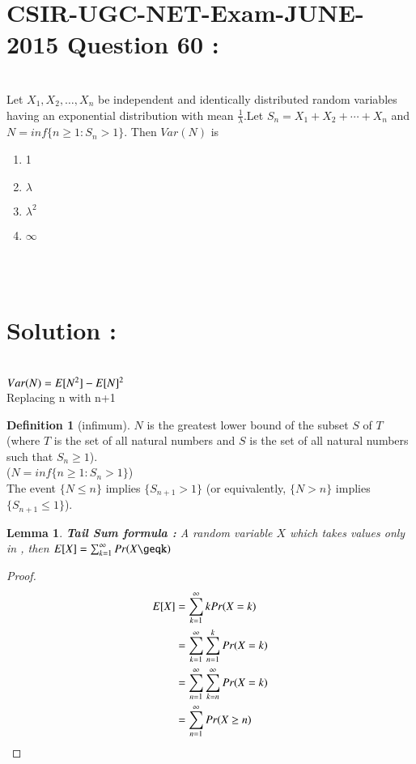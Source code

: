 \documentclass[journal,12pt,twocolumn]{IEEEtran}
\newtheorem{lemma}[theorem]{Lemma}
\theoremstyle{definition}
\newtheorem{definition}{Definition}[section]
\begin{document}
\section{CSIR-UGC-NET-Exam-JUNE-2015 Question 60 :}\\
Let $X_1, X_2, \dots, X_n$ be independent and identically distributed random variables having an exponential distribution with mean $\frac{1}{\lambda}$.Let $S_n = X_1 + X_2 + \cdots + X_n$ and $N = inf \{n \geq 1: S_n > 1\}$. Then $Var(N)$ is\\
\begin{enumerate}
    \item 1
    \item $\lambda$
    \item $\lambda^2$
    \item $\infty$
\end{enumerate}
\\ \\
\section{Solution :}\\
$Var(N) = E[ N^2 ] - E[ N ]^2$\\
Replacing n with n+1\\
\begin{definition}[infimum]
$N$ is the greatest lower bound of the subset $S$ of $T$ (where $T$ is the set of all natural numbers and $S$ is the set of all natural numbers such that $S_n \geq 1$).\\
($N = inf \{n \geq 1: S_n > 1\}$)\\
The event $\{N \leq n\}$ implies $\{S_{n+1} > 1\}$ (or equivalently, $\{N > n\}$ implies $\{S_{n+1} \leq 1\}$).\\
\end{definition}

\begin{lemma}\label{lemma1}
\textbf{Tail Sum formula : } A random variable $X$ which takes values only in , then $\mean{X} = \sum _{k=1} ^\infty Pr(X\geqk)$\\
\end{lemma}
\begin{proof}
\begin{align}
    E[ X ] &= \sum _{k = 1} ^\infty k Pr(X=k)\\
    &= \sum _{k = 1} ^\infty \sum _{n=1} ^k Pr(X=k)\\
    &= \sum _{n = 1} ^\infty \sum _{k = n} ^\infty Pr(X=k)\\
    &= \sum _{n = 1} ^\infty Pr(X\geq n)
\end{align}
\end{proof}
\end{document}
